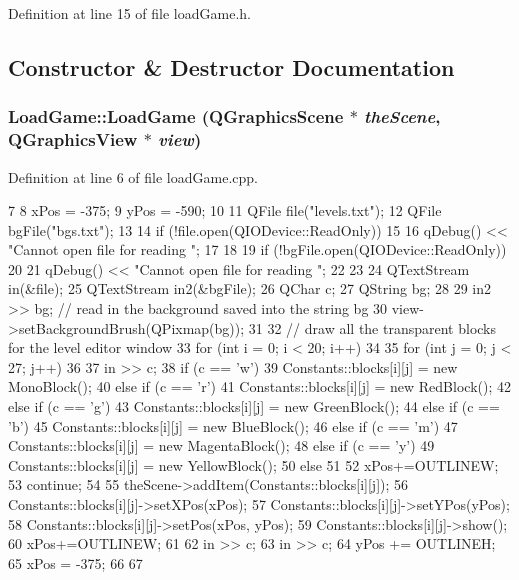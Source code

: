 Definition at line 15 of file loadGame.h.

\subsection{Constructor \& Destructor Documentation}
\hypertarget{class_load_game_a23098f270c37e5a7eb6796068cad5965}{
\subsubsection[{LoadGame}]{\setlength{\rightskip}{0pt plus 5cm}LoadGame::LoadGame (QGraphicsScene $\ast$ {\em theScene}, \/  QGraphicsView $\ast$ {\em view})}}
\label{class_load_game_a23098f270c37e5a7eb6796068cad5965}


Definition at line 6 of file loadGame.cpp.


\begin{DoxyCode}
7 {
8     xPos = -375;
9     yPos = -590;
10 
11     QFile file("levels.txt");
12     QFile bgFile("bgs.txt");
13 
14     if (!file.open(QIODevice::ReadOnly))
15     {
16         qDebug() << "Cannot open file for reading ";
17     }
18     
19      if (!bgFile.open(QIODevice::ReadOnly))
20     {
21         qDebug() << "Cannot open file for reading ";
22     }
23 
24     QTextStream in(&file);
25     QTextStream in2(&bgFile);
26     QChar c;
27     QString bg;
28     
29     in2 >> bg;              // read in the background saved into the string bg
30     view->setBackgroundBrush(QPixmap(bg));
31 
32     // draw all the transparent blocks for the level editor window
33     for (int i = 0; i < 20; i++)
34     {
35         for (int j = 0; j < 27; j++)
36         {
37             in >> c;
38             if (c == 'w')
39                 Constants::blocks[i][j] = new MonoBlock();
40             else if (c == 'r')
41                 Constants::blocks[i][j] = new RedBlock();
42             else if (c == 'g')
43                 Constants::blocks[i][j] = new GreenBlock();
44             else if (c == 'b')
45                 Constants::blocks[i][j] = new BlueBlock();
46             else if (c == 'm')
47                 Constants::blocks[i][j] = new MagentaBlock();
48             else if (c == 'y')
49                 Constants::blocks[i][j] = new YellowBlock();
50             else
51             {
52                 xPos+=OUTLINEW;
53                 continue;
54             }
55             theScene->addItem(Constants::blocks[i][j]);
56             Constants::blocks[i][j]->setXPos(xPos);
57             Constants::blocks[i][j]->setYPos(yPos);
58             Constants::blocks[i][j]->setPos(xPos, yPos);
59             Constants::blocks[i][j]->show();
60             xPos+=OUTLINEW;
61         }
62         in >> c;
63         in >> c;
64         yPos += OUTLINEH;
65         xPos = -375;
66     }
67 }
\end{DoxyCode}


